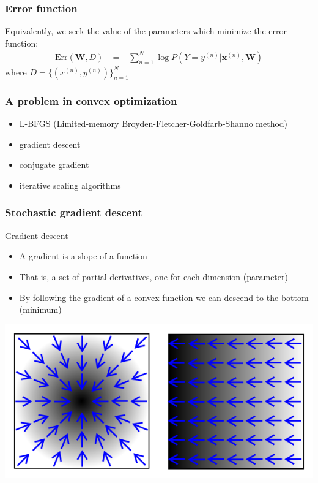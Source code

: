 \documentclass[14pt,mathserif,dvipsnames,usenames]{beamer}
\newcommand{\x}{\mathbf{x}}
\newcommand{\W}{\mathbf{W}}
\begin{document}
  \begin{frame}
  \frametitle{Error function}
Equivalently, we seek the value of the parameters which
\alert{minimize} the error function:
  \begin{align*}
    \mathrm{Err}(\W,D) & = - \sum_{n=1}^N \log P(Y=y^{(n)}|\x^{(n)},\W)
  \end{align*}
where $D = \{(x^{(n)},y^{(n)})\}_{n=1}^N$
\end{frame}

\begin{frame}  \frametitle{A problem in convex optimization}
\begin{itemize}
\item L-BFGS (Limited-memory Broyden-Fletcher-Goldfarb-Shanno method)
\item gradient descent
\item conjugate gradient
\item iterative scaling algorithms
\end{itemize}
\end{frame}

\begin{frame}
  \frametitle{Stochastic gradient descent}
  \begin{block}{Gradient descent}
    \begin{itemize}
    \item A gradient is a slope of a function
    \item That is, a set of partial derivatives, one for each
      dimension (parameter)
    \item By following the gradient of a convex function we can
     \alert{descend} to the bottom (minimum) 
    \end{itemize}
  \end{block}
\end{frame}

\begin{frame}
  \begin{center}
    \includegraphics[scale=0.5]{Gradient2.png}
  \end{center}
\end{frame}
\end{document}
